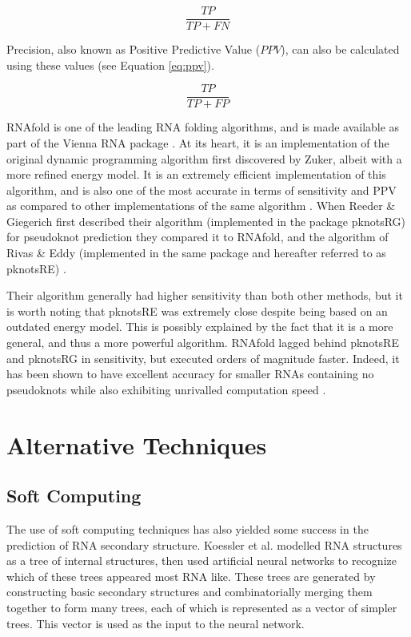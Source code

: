 \documentclass{cshonours}
\begin{document}
\begin{equation} \label{eq:tpr}
 \frac{TP}{TP + FN}
\end{equation}

Precision, also known as Positive Predictive Value ($PPV$), can also be calculated
using these values (see Equation \ref{eq:ppv}).


\begin{equation} \label{eq:ppv}
 \frac{TP}{TP + FP}
\end{equation}

RNAfold is one of the leading RNA folding algorithms, and is made available
as part of the Vienna RNA package \cite{lorenz2011viennarna}. At its heart, it is an implementation
of the original dynamic programming algorithm first discovered by Zuker, albeit
with a more refined energy model. It is an extremely efficient implementation of
this algorithm, and is also one of the most accurate in terms of sensitivity and
PPV as compared to other implementations of the same algorithm \cite{lorenz2011viennarna}. When
Reeder \& Giegerich \cite{reeder2004design} first described their algorithm (implemented in the package pknotsRG) for pseudoknot prediction they compared it to RNAfold, and the
algorithm of Rivas \& Eddy (implemented in the same package and hereafter
referred to as pknotsRE) \cite{rivas1999dynamic}. 

Their algorithm generally had higher sensitivity than
both other methods, but it is worth noting that pknotsRE was extremely close
despite being based on an outdated energy model. This is possibly explained by
the fact that it is a more general, and thus a more powerful algorithm. RNAfold
lagged behind pknotsRE and pknotsRG in sensitivity, but executed orders of magnitude faster. Indeed, it has been shown to have excellent accuracy for smaller RNAs containing
no pseudoknots while also exhibiting unrivalled computation speed \cite{lorenz2011viennarna}.


\section{Alternative Techniques}


\subsection{Soft Computing}
The use of soft computing techniques has also yielded some success in the prediction of RNA secondary structure. Koessler et al. \cite{koessler2010predictive} modelled RNA structures
as a tree of internal structures, then used artificial neural networks to recognize
which of these trees appeared most RNA like. These trees are generated by constructing basic secondary structures and combinatorially merging them together
to form many trees, each of which is represented as a vector of simpler trees.
This vector is used as the input to the neural network. 
\end{document}
